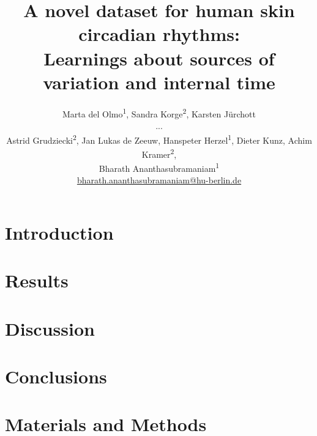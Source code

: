 \documentclass[twoside]{article} %
\title{
	A novel dataset for human skin circadian rhythms: \\[.1ex]
	Learnings about sources of variation and internal time} %
\author{%
	Marta del Olmo\textsuperscript{1}, Sandra Korge\textsuperscript{2}, Karsten J\"urchott \\[.1ex]
	...\\[.1ex]
	Astrid Grudziecki\textsuperscript{2}, Jan Lukas de Zeeuw, Hanspeter Herzel\textsuperscript{1}, Dieter Kunz, Achim Kramer\textsuperscript{2},\\[.1ex]
	Bharath Ananthasubramaniam\textsuperscript{1}\\[1ex]
\normalsize \href{mailto:bharath.ananthasubramaniam@hu-berlin.de}{bharath.ananthasubramaniam@hu-berlin.de} %
}
\date{} %
\begin{document}
\maketitle


\section{Introduction}



\section{Results}


\section{Discussion}


\section{Conclusions}

\newpage
\section{Materials and Methods}

\newpage
\section*{}

\newpage
\setcounter{table}{0}
\setcounter{figure}{0}
\renewcommand{\thetable}{S\arabic{table}}%
\renewcommand{\thefigure}{S\arabic{figure}}%
\end{document}
